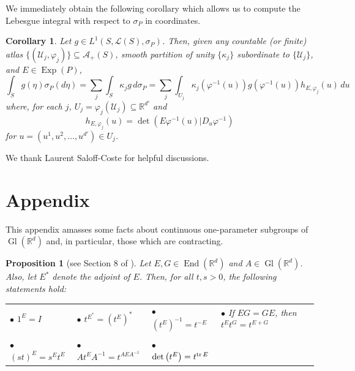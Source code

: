 \documentclass[11pt]{article}
\newtheorem{corollary}[theorem]{Corollary}
\newtheorem{proposition}[theorem]{Proposition}
\theoremstyle{remark}
\newcommand\End{\operatorname{End}} %
\newcommand\Gl{\operatorname{Gl}} %
\newcommand\Exp{\operatorname{Exp}}
\renewcommand\det{\operatorname{det}}
\begin{document}
\noindent We immediately obtain the following corollary which allows us to compute the Lebesgue integral with respect to $\sigma_P$ in coordinates.
\begin{corollary}\label{cor:IntegralFormula}
Let $g\in L^1(S,\mathcal{L}(S),\sigma_P)$. Then, given any  countable (or finite) atlas $\{(\mathcal{U}_j,\varphi_j)\}\subseteq\mathcal{A}_+(S)$,  smooth partition of unity $\{\kappa_j\}$ subordinate to $\{\mathcal{U}_j\}$, and $E\in\Exp(P)$,
\begin{equation*}
\int_S g(\eta)\sigma_P(d\eta)=\sum_{j}\int_S \kappa_jg\,d\sigma_P=\sum_j\int_{U_j}\kappa_j(\varphi^{-1}(u))g(\varphi^{-1}(u))h_{E,\varphi_j}(u)\,du
\end{equation*}
where, for each $j$, $U_j=\varphi_j(\mathcal{U}_j)\subseteq\mathbb{R}^{d'}$ and
\begin{equation*}
    h_{E,\varphi_j}(u)=\det(E\varphi^{-1}(u)\vert D_u\varphi^{-1})
\end{equation*}
for $u=(u^1,u^2,\dots,u^{d'})\in U_j$. 
\end{corollary}

\vspace{.4cm}
 We thank Laurent Saloff-Coste for helpful discussions.



\appendix
\section{Appendix} %


This appendix amasses some facts about continuous one-parameter subgroups of $\Gl(\mathbb{R}^d)$ and, in particular, those which are contracting.


\begin{proposition}[see Section 8 of \cite{randles_convolution_2017}]\label{prop:ContinuousGroupProperties}
Let $E,G\in\End(\mathbb{R}^d)$ and $A\in\Gl(\mathbb{R}^d)$. Also, let $E^*$ denote the adjoint of $E$. Then, for all $t,s>0$, the following statements hold:

\vspace{.3cm}
\begin{tabular}{lllll}
$\bullet$ $1^E=I$ &  $\bullet$ $t^{E^*}=(t^E)^*$ & $\bullet$ $(t^E)^{-1}=t^{-E}$ &   $\bullet$ If $EG=GE$, then $t^Et^G=t^{E+G}$\\
\vspace{.1cm}\\
$\bullet$ $(st)^E=s^Et^E$ & $\bullet$ $At^EA^{-1}=t^{AEA^{-1}}$&  $\bullet$ $\det\left(t^E\right)=t^{\tr E}$\\
\end{tabular}
\end{proposition}
\end{document}
